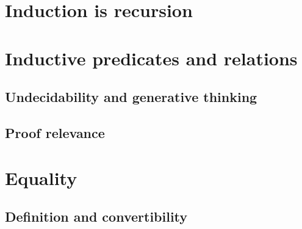 \documentclass{beamer}
\begin{document}
\section{Induction is recursion}


\section{Inductive predicates and relations}

\subsection{Undecidability and generative thinking}

\subsection{Proof relevance}

\section{Equality}

\subsection{Definition and convertibility}

\end{document}

